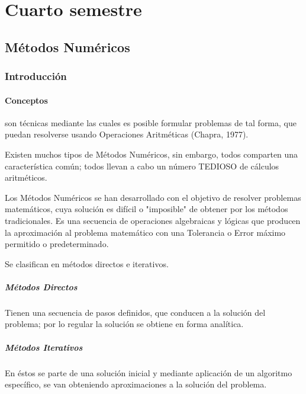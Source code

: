 \part{Cuarto semestre}



\chapter{Métodos Numéricos}

\section{Introducción}
\subsection{Conceptos}
\begin{definition}
    son técnicas mediante las cuales es posible formular problemas de tal forma, que puedan resolverse usando Operaciones Aritméticas (Chapra, 1977).
\end{definition}
Existen muchos tipos de Métodos Numéricos, sin embargo, todos comparten una característica común; todos llevan a cabo un número TEDIOSO de cálculos aritméticos.

Los Métodos Numéricos se han desarrollado con el objetivo de resolver problemas matemáticos, cuya solución es difícil o "imposible" de obtener por los métodos tradicionales. Es una secuencia de operaciones algebraicas y lógicas que producen la aproximación al problema matemático con una Tolerancia o Error máximo permitido o predeterminado.

Se clasifican en métodos directos e iterativos.

\subsubsection{Métodos Directos}
Tienen una secuencia de pasos definidos, que conducen a la solución del problema; por lo regular la solución se obtiene en forma analítica.

\subsubsection{Métodos Iterativos}

En éstos se parte de una solución inicial y mediante aplicación de un algoritmo específico, se van obteniendo aproximaciones a la solución del problema.

